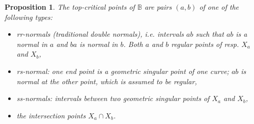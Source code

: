 \documentclass[10pt,a4paper]{amsart}
\newtheorem{prop}{Proposition}
\begin{document}
\begin{prop}\label{p:double-crit}
The top-critical points of $ \mathbb{B}$ are pairs $(a,b)$ of one of the following types:
\begin{itemize}
\item rr-normals (traditional double normals),  i.e. intervals $ab$ such that $ab$ is a normal in $a$ and $ba$ is  normal in $b$. Both $a$ and $b$ regular points of resp. $X_a$ and $X_b$,
\item rs-normal:   one end point is a geometric singular point of one curve;
 $ab$ is normal at the other point, which is assumed to be  regular,
 \item ss-normals: intervals between two geometric singular points of $X_a$ and $X_b$,
 \item the intersection points $X_a \cap X_b$.
\end{itemize}
\end{prop}
\end{document}
